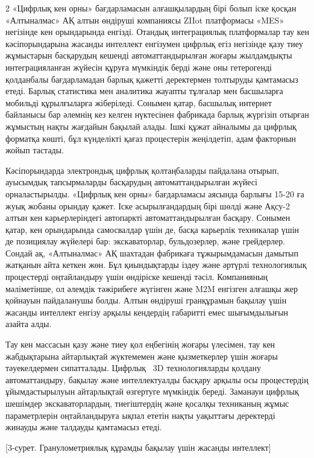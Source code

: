 \begin{multicols}{2}
«Цифрлық кен орны» бағдарламасын алғашқылардың бірі болып іске қосқан
«Алтыналмас» АҚ алтын өндіруші компаниясы ZIIot платформасы «MES»
негізінде кен орындарында енгізді. Отандық интеграциялық платформалар
тау кен кәсіпорындарына жасанды интеллект енгізумен цифрлық егіз
негізінде қазу тиеу жұмыстарын басқарудың кешенді автоматтандырылған
жоғары жылдамдықты интеграцияланған жүйесін құруға мүмкіндік берді және
оны гетерогенді қолданбалы бағдарламадан барлық қажетті деректермен
толтыруды қамтамасыз етеді. Барлық статистика мен аналитика жауапты
тұлғалар мен басшыларға мобильді құрылғыларға жіберіледі. Сонымен қатар,
басшылық интернет байланысы бар әлемнің кез келген нүктесінен фабрикада
барлық жүргізіп отырған жұмыстың нақты жағдайын бақылай алады. Ішкі
құжат айналымы да цифрлық форматқа көшті, бұл күнделікті қағаз
процестерін жеңілдетіп, адам факторнын жойып тастады.

Кәсіпорындарда электрондық цифрлық қолтаңбаларды пайдалана отырып,
ауысымдық тапсырмаларды басқарудың автоматтандырылған жүйесі
орналастырылды. «Цифрлық кен орны» бағдарламасы аясында барлығы 15-20 ға
жуық жобаны орындау қажет. Іске асырылғандардың бірі шөлді және Ақсу-2
алтын кен карьерлеріндегі автопаркті автоматтандырылған басқару. Сонымен
қатар, кен орындарында самосвалдар үшін де, басқа карьерлік техникалар
үшін де позициялау жүйелері бар: экскаваторлар, бульдозерлер, және
грейдерлер. Сондай ақ, «Алтыналмас» АҚ шахтадан фабрикаға тұжырымдамасын
дамытып жатқанын айта кеткен жөн. Бұл қиындықтарды іздеу және әртүрлі
технологиялық процестерді оңтайландыру үшін өндіріске кешенді тәсіл.
Компанияның мәліметінше, ол әлемдік тәжірибеге жүгінген және M2M
енгізген алғашқы жер қойнауын пайдаланушы болды. Алтын өндіруші
гранқұрамын бақылау үшін жасанды интеллект енгізу арқылы кендердің
габаритті емес шығымдылығын азайта алды.

Тау кен массасын қазу және тиеу қол еңбегінің жоғары үлесімен, тау кен
жабдықтарына айтарлықтай жүктемемен және қызметкерлер үшін жоғары
тәуекелдермен сипатталады. Цифрлық ~3D технологияларды қолдану
автоматтандыру, бақылау және интеллектуалды басқару арқылы осы
процестердің ұйымдастырылуын айтарлықтай өзгертуге мүмкіндік береді.
Заманауи цифрлық шешімдер экскаваторлардың, тиегіштердің және қосалқы
техниканың жұмыс параметрлерін оңтайландыруға ықпал ететін нақты
уақыттағы деректерді жинауды және талдауды қамтамасыз етеді.
\end{multicols}

[3-сурет. Гранулометриялық құрамды бақылау үшін жасанды
интеллект]


